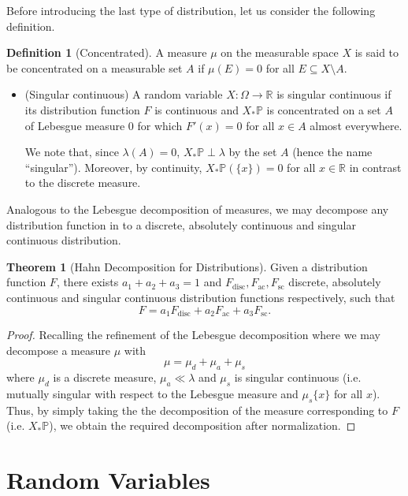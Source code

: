 \documentclass[]{article}
\theoremstyle{definition}
\newtheorem{theorem}{Theorem}
\theoremstyle{definition}
\newtheorem{definition}{Definition}[section]
\begin{document}
Before introducing the last type of distribution, let us consider the following 
definition.

\begin{definition}[Concentrated]
  A measure \(\mu\) on the measurable space \(X\) is said to be concentrated on a 
  measurable set \(A\) if \(\mu(E) = 0\) for all \(E \subseteq X \setminus A\).
\end{definition}

\begin{itemize}
  \item (Singular continuous) A random variable \(X : \Omega \to \mathbb{R}\) is 
  singular continuous if its distribution function \(F\) is continuous and 
  \(X_* \mathbb{P}\) is concentrated on a set \(A\) of Lebesgue measure 0 for 
  which \(F'(x) = 0\) for all \(x \in A\) almost everywhere. 

  We note that, since \(\lambda(A) = 0\), \(X_* \mathbb{P} \perp \lambda\) by 
  the set \(A\) (hence the name ``singular''). Moreover, by continuity, 
  \(X_* \mathbb{P}(\{x\}) = 0\) for all \(x \in \mathbb{R}\) in contrast to the 
  discrete measure.
\end{itemize}

Analogous to the Lebesgue decomposition of measures, we may decompose any distribution 
function in to a discrete, absolutely continuous and singular continuous distribution.

\begin{theorem}[Hahn Decomposition for Distributions]
  Given a distribution function \(F\), there exists \(a_1 + a_2 + a_3 = 1\) 
  and \(F_{\text{disc}}, F_{\text{ac}}, F_{\text{sc}}\) discrete, absolutely 
  continuous and singular continuous distribution functions respectively, such that 
  \[F = a_1 F_{\text{disc}} + a_2 F_{\text{ac}} + a_3 F_{\text{sc}}.\]
\end{theorem}
\begin{proof}
  Recalling the refinement of the Lebesgue decomposition where we may decompose 
  a measure \(\mu\) with 
  \[\mu = \mu_d + \mu_a + \mu_s\]
  where \(\mu_d\) is a discrete measure, \(\mu_a \ll \lambda\) and \(\mu_s\) is 
  singular continuous (i.e. mutually singular with respect to the Lebesgue measure 
  and \(\mu_s\{x\}\) for all \(x\)). Thus, by simply taking the the decomposition 
  of the measure corresponding to \(F\) (i.e. \(X_*\mathbb{P}\)), we obtain the 
  required decomposition after normalization.
\end{proof}

\newpage
\section{Random Variables}
\end{document}
